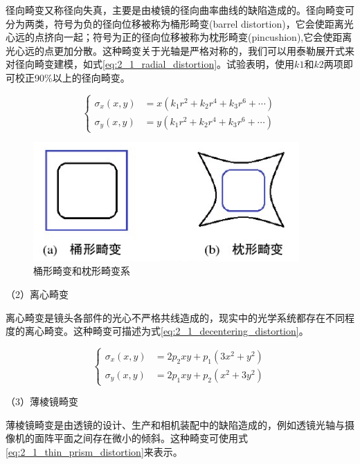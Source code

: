 径向畸变又称径向失真，主要是由棱镜的径向曲率曲线的缺陷造成的。径向畸变可分为两类，符号为负的径向位移被称为桶形畸变(barrel distortion)，它会使距离光心远的点挤向一起；符号为正的径向位移被称为枕形畸变(pincushion),它会使距离光心远的点更加分散。这种畸变关于光轴是严格对称的，我们可以用泰勒展开式来对径向畸变建模，如式\ref{eq:2_1_radial_distortion}。试验表明，使用$k1$和$k2$两项即可校正90\%以上的径向畸变\cite{hartley2003multiple}。

\begin{equation}\label{eq:2_1_radial_distortion}
\left\{
\begin{aligned}
\sigma_x(x,y) &= x(k_1 r^2 + k_2 r^4 + k_3 r^6 + \cdots)  \\
\sigma_y(x,y) &= y(k_1 r^2 + k_2 r^4 + k_3 r^6 + \cdots) 
\end{aligned}
\right.
\end{equation}

\begin{figure}[!htb] %
	\centering
	\includegraphics[width=4in]{figures/2_1_radial_distortion}
	\caption{桶形畸变和枕形畸变系}\label{fig:2_1_radial_distortion}
\end{figure}

（2）离心畸变

离心畸变是镜头各部件的光心不严格共线造成的，现实中的光学系统都存在不同程度的离心畸变。这种畸变可描述为式\ref{eq:2_1_decentering_distortion}。

\begin{equation}\label{eq:2_1_decentering_distortion}
\left\{
\begin{aligned}
\sigma_x(x,y) &= 2p_2 xy + p_1 (3x^2 + y^2)  \\
\sigma_y(x,y) &= 2p_1 xy + p_2 (x^2+ 3y^2)
\end{aligned}
\right.
\end{equation}

（3）薄棱镜畸变

薄棱镜畸变是由透镜的设计、生产和相机装配中的缺陷造成的，例如透镜光轴与摄像机的面阵平面之间存在微小的倾斜。这种畸变可使用式\ref{eq:2_1_thin_prism_distortion}来表示。

